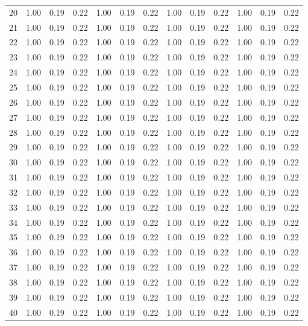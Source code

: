 \begin{longtable}[c]{|c|c|c|c|c|c|c|c|c|c|c|c|c|}
20 & 1.00 & 0.19 & 0.22 & 1.00 & 0.19 & 0.22 & 1.00 & 0.19 & 0.22 & 1.00 & 0.19 & 0.22 \\
21 & 1.00 & 0.19 & 0.22 & 1.00 & 0.19 & 0.22 & 1.00 & 0.19 & 0.22 & 1.00 & 0.19 & 0.22 \\
22 & 1.00 & 0.19 & 0.22 & 1.00 & 0.19 & 0.22 & 1.00 & 0.19 & 0.22 & 1.00 & 0.19 & 0.22 \\
23 & 1.00 & 0.19 & 0.22 & 1.00 & 0.19 & 0.22 & 1.00 & 0.19 & 0.22 & 1.00 & 0.19 & 0.22 \\
24 & 1.00 & 0.19 & 0.22 & 1.00 & 0.19 & 0.22 & 1.00 & 0.19 & 0.22 & 1.00 & 0.19 & 0.22 \\
25 & 1.00 & 0.19 & 0.22 & 1.00 & 0.19 & 0.22 & 1.00 & 0.19 & 0.22 & 1.00 & 0.19 & 0.22 \\
26 & 1.00 & 0.19 & 0.22 & 1.00 & 0.19 & 0.22 & 1.00 & 0.19 & 0.22 & 1.00 & 0.19 & 0.22 \\
27 & 1.00 & 0.19 & 0.22 & 1.00 & 0.19 & 0.22 & 1.00 & 0.19 & 0.22 & 1.00 & 0.19 & 0.22 \\
28 & 1.00 & 0.19 & 0.22 & 1.00 & 0.19 & 0.22 & 1.00 & 0.19 & 0.22 & 1.00 & 0.19 & 0.22 \\
29 & 1.00 & 0.19 & 0.22 & 1.00 & 0.19 & 0.22 & 1.00 & 0.19 & 0.22 & 1.00 & 0.19 & 0.22 \\
30 & 1.00 & 0.19 & 0.22 & 1.00 & 0.19 & 0.22 & 1.00 & 0.19 & 0.22 & 1.00 & 0.19 & 0.22 \\
31 & 1.00 & 0.19 & 0.22 & 1.00 & 0.19 & 0.22 & 1.00 & 0.19 & 0.22 & 1.00 & 0.19 & 0.22 \\
32 & 1.00 & 0.19 & 0.22 & 1.00 & 0.19 & 0.22 & 1.00 & 0.19 & 0.22 & 1.00 & 0.19 & 0.22 \\
33 & 1.00 & 0.19 & 0.22 & 1.00 & 0.19 & 0.22 & 1.00 & 0.19 & 0.22 & 1.00 & 0.19 & 0.22 \\
34 & 1.00 & 0.19 & 0.22 & 1.00 & 0.19 & 0.22 & 1.00 & 0.19 & 0.22 & 1.00 & 0.19 & 0.22 \\
35 & 1.00 & 0.19 & 0.22 & 1.00 & 0.19 & 0.22 & 1.00 & 0.19 & 0.22 & 1.00 & 0.19 & 0.22 \\
36 & 1.00 & 0.19 & 0.22 & 1.00 & 0.19 & 0.22 & 1.00 & 0.19 & 0.22 & 1.00 & 0.19 & 0.22 \\
37 & 1.00 & 0.19 & 0.22 & 1.00 & 0.19 & 0.22 & 1.00 & 0.19 & 0.22 & 1.00 & 0.19 & 0.22 \\
38 & 1.00 & 0.19 & 0.22 & 1.00 & 0.19 & 0.22 & 1.00 & 0.19 & 0.22 & 1.00 & 0.19 & 0.22 \\
39 & 1.00 & 0.19 & 0.22 & 1.00 & 0.19 & 0.22 & 1.00 & 0.19 & 0.22 & 1.00 & 0.19 & 0.22 \\
40 & 1.00 & 0.19 & 0.22 & 1.00 & 0.19 & 0.22 & 1.00 & 0.19 & 0.22 & 1.00 & 0.19 & 0.22 \\
\end{longtable}

